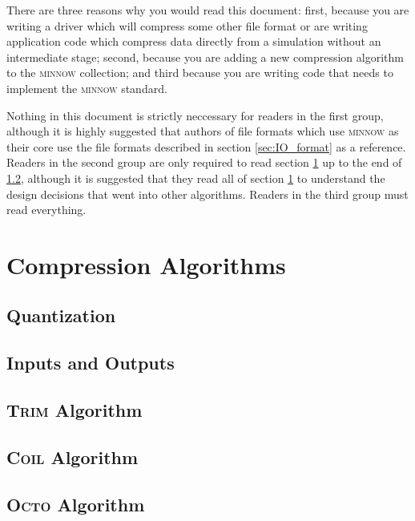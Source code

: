 \documentclass[numberedappendix,apj]{emulateapj}
\begin{document}
There are three reasons why you would read this document: first, because you
are writing a driver which will compress some other file format or are writing
application code which compress data directly from a simulation without an
intermediate stage; second, because you are adding a new compression algorithm
to the \textsc{minnow} collection; and third because you are writing code that
needs to implement the \textsc{minnow} standard.

Nothing in this document is strictly neccessary for readers in the first group,
although it is highly suggested that authors of file formats which use
\textsc{minnow} as their core use the file formats described in section
\ref{sec:IO_format} as a reference. Readers in the second group are only
required to read section \ref{sec:compress} up to the end of
\ref{sec:input_and_output}, although it is suggested that they read all of
section \ref{sec:compress} to understand the design decisions that went into
other algorithms. Readers in the third group must read everything.

\section{Compression Algorithms}
\label{sec:compress}

\subsection{Quantization}
\label{sec:quantization}

\subsection{Inputs and Outputs}
\label{sec:input_and_output}

\subsection{\textsc{Trim} Algorithm}
\label{sec:trim}

\subsection{\textsc{Coil} Algorithm}
\label{sec:coil}

\subsection{\textsc{Octo} Algorithm}
\label{sec:octo}
\end{document}
